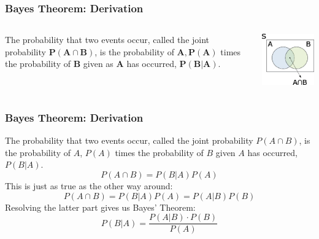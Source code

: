 \documentclass{beamer}
\begin{document}
\begin{frame}
    \frametitle{Bayes Theorem: Derivation}
    \begin{columns}
        \begin{column}{0.5\textwidth}
            The probability that two events occur, called the joint probability $\mathbf{P(A \cap B)}$, is the probability of $\mathbf{A, P(A)}$ times the probability of $\mathbf{B}$ given as $\mathbf{A}$ has occurred, $\mathbf{P(B|A)}$.
        \end{column}
        \begin{column}{0.5\textwidth}
            \includegraphics[width=\textwidth]{lectures/day_11_bayesian_lm/figures/joint_prob.jpg}
        \end{column}
    \end{columns}
\end{frame}

\begin{frame}
    \frametitle{Bayes Theorem: Derivation}
    \large
    The probability that two events occur, called the joint probability $P(A \cap B)$, is the probability of $A$, $P(A)$ times the probability of $B$ given $A$ has occurred, $P(B|A)$.
    \[
    P(A \cap B) = P(B|A) P(A)
    \]
    This is just as true as the other way around:
    \[
    P(A \cap B) = P(B|A) P(A) = P(A|B) P(B)
    \]
    Resolving the latter part gives us Bayes' Theorem:
    \[
    P(B|A) = \frac{P(A|B) \cdot P(B)}{P(A)}
    \]
\end{frame}
\end{document}

